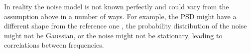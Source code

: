 \documentclass[%
 reprint,
superscriptaddress,
nofootinbib,
 amsmath,amssymb,
 aps,
colorlinks = true, 
linkcolor = blue, 
urlcolor = blue, 
citecolor = blue, 
anchorcolor = blue,
]{revtex4-2}
\newcommand{\ls}[1]{\textcolor{purple}{[Lorenzo: #1]}}
\begin{document}
In reality the noise model is not known perfectly and could vary from the assumption above in a number of ways. For example, the PSD might have a different shape from the reference one \cite{babak2021lisa}, the probability distribution of the noise might not be Gaussian, or the noise might not be stationary, leading to correlations between frequencies. 



\end{document}
